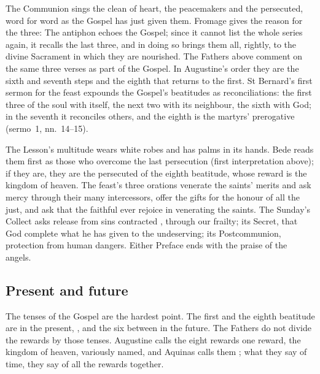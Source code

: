 The Communion sings the clean of heart, the peacemakers and the persecuted,
word for word as the Gospel has just given them. Fromage gives the
reason for the three:  The antiphon echoes the Gospel;
since it cannot list the whole series again, it recalls the last three, and in
doing so brings them all, rightly, to the divine Sacrament in which they are
nourished. The Fathers above comment on the same three verses as part of the
Gospel. In Augustine's order they are the sixth and seventh steps and the
eighth that returns to the first. St Bernard's first sermon for the feast expounds the Gospel's
beatitudes as reconciliations: the first three of the soul with itself, the
next two with its neighbour, the sixth with God; in the seventh it reconciles
others, and the eighth is the martyrs' prerogative (sermo~1, nn.~14--15).

The Lesson's multitude wears white robes and has palms in its hands. Bede
reads them first as those who overcome the last persecution (first
interpretation above); if they are, they are the persecuted of the eighth
beatitude, whose reward is the kingdom of heaven. The feast's three orations
venerate the saints' merits and ask mercy through their many intercessors,
offer the gifts for the honour of all the just, and ask that the faithful ever
rejoice in venerating the saints. The Sunday's Collect asks release from sins contracted
, through our frailty; its Secret, that God
complete what he has given to the undeserving; its Postcommunion, protection
from human dangers. Either Preface ends with the praise of the angels.

\subsection{Present and future}
\label{sec:beatitudes-difficulty}

The tenses of the Gospel are the hardest point. The first and the eighth
beatitude are in the present, , and the six between in the future.
The Fathers do not divide the rewards by those tenses. Augustine calls the
eight rewards one reward, the kingdom of heaven, variously named, and Aquinas
calls them ; what they say of time, they say of all the
rewards together.

